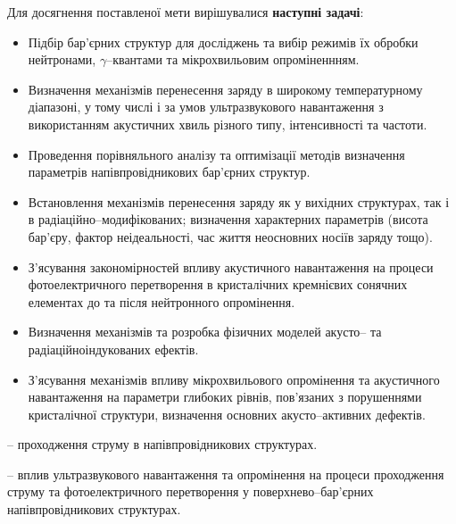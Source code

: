 Для досягнення поставленої мети вирішувалися \textbf{наступні задачі}:
\begin{itemize}[leftmargin=0em,itemindent=1.5em]
\renewcommand{\labelitemi}{$\bullet$}
  \item Підбір бар'єрних структур для досліджень та вибір режимів їх обробки нейтронами, $\gamma$--квантами та мікрохвильовим опроміненнням.

  \item Визначення механізмів перенесення заряду в широкому температурному діапазоні, у тому числі і за умов ультразвукового навантаження з використанням акустичних хвиль різного типу, інтенсивності та частоти.

 \item Проведення порівняльного аналізу та оптимізації методів визначення параметрів напівпровідникових бар'єрних структур.

  \item Встановлення механізмів перенесення заряду як у вихідних структурах, так і в радіаційно--модифікованих; визначення характерних параметрів (висота бар'єру, фактор неідеальності, час життя неосновних носіїв заряду тощо).

  \item З'ясування закономірностей впливу акустичного навантаження на процеси фотоелектричного перетворення в кристалічних кремнієвих сонячних елементах до та після нейтронного опромінення.

  \item Визначення механізмів та розробка фізичних моделей акусто-- та радіаційноіндукованих ефектів.

  \item З'ясування механізмів впливу мікрохвильового опромінення та акустичного навантаження на параметри глибоких рівнів, пов'язаних з порушеннями кристалічної структури,
  визначення основних акусто--активних дефектів.

\end{itemize}


{\ObjectTXT} --
проходження струму в напівпровідникових структурах.

{\PredmetTXT}--
вплив ультразвукового навантаження та опромінення на
процеси проходження струму та фотоелектричного перетворення у поверхнево--бар'єрних напівпровідникових структурах.


